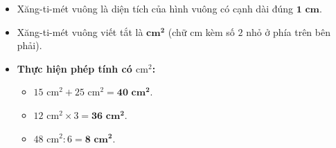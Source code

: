 \documentclass[11pt,a4paper]{article}
\begin{document}
\begin{minipage}[t]{0.49\textwidth}\vspace{0pt}
\begin{tcolorbox}[
  enhanced,
  colback=teal!4!white,
  colframe=teal!75!black,
  arc=2mm, boxrule=0.8pt,
  left=2mm, right=2mm, top=1.8mm, bottom=1.8mm,
  title={\footnotesize\bfseries\color{white}\faSliders\ 2. Đơn vị Xăng-ti-mét vuông ($\\text{cm}^2$)}
]
{\footnotesize
\begin{itemize}\setlength{\itemsep}{1.5pt}\setlength{\leftskip}{-2.5mm}
  \item Xăng-ti-mét vuông là diện tích của hình vuông có cạnh dài đúng $\mathbf{1\text{ cm}}$.
  \item Xăng-ti-mét vuông viết tắt là $\mathbf{\text{cm}^2}$ (chữ $\text{cm}$ kèm số $2$ nhỏ ở phía trên bên phải).
  \item \textbf{Thực hiện phép tính có $\text{cm}^2$:}
  \begin{itemize}\setlength{\itemsep}{0.5pt}\setlength{\leftskip}{-2.5mm}
    \item $15\text{ cm}^2 + 25\text{ cm}^2 = \mathbf{40\text{ cm}^2}$.
    \item $12\text{ cm}^2 \times 3 = \mathbf{36\text{ cm}^2}$.
    \item $48\text{ cm}^2 : 6 = \mathbf{8\text{ cm}^2}$.
  \end{itemize}
\end{itemize}
}
\end{tcolorbox}
\end{minipage}
\end{document}
